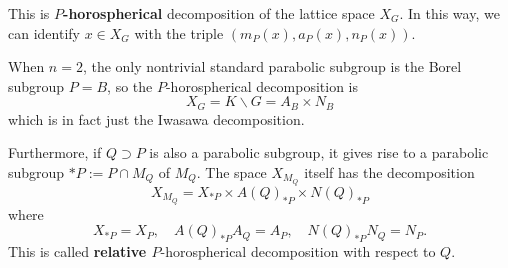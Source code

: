 This is \textbf{$P$-horospherical} decomposition of the lattice space $X_G$. In this way,
we can identify  $x \in X_G$ with the triple $(m_P(x), a_P(x),n_P(x))$.
\begin{example}
    When $n=2$, the only nontrivial standard parabolic subgroup is the Borel subgroup $P=B$, 
    so the $P$-horospherical decomposition is 
    \[X_G = K\backslash G = A_B \times N_B\]
    which is in fact just the Iwasawa decomposition. 
\end{example}
Furthermore, if $Q\supset P$ is also a parabolic subgroup, it gives rise to a parabolic subgroup $\ast P := P \cap M_Q$ of $M_Q$.
The space $X_{M_Q}$ itself has the decomposition
\[X_{M_Q} = X_{\ast P} \times A(Q)_{\ast P} \times N(Q)_{\ast P}\]
where $$ X_{\ast P} = X_P, \quad A(Q)_{\ast P}A_Q=A_P, \quad N(Q)_{\ast P}N_Q=N_P.$$ This is called \textbf{relative $P$}-horospherical decomposition with respect to $Q$.
\begin{example}
    
\end{example}
